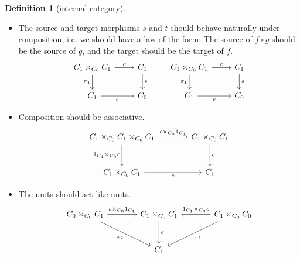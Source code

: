 \documentclass[a4paper,10pt]{scrreprt}
\theoremstyle{definition}
\newtheorem{definition}{Definition}[section]
\theoremstyle{plain}
\theoremstyle{remark}
\begin{document}
\begin{definition}[internal category]
\begin{itemize}
    \item The source and target morphisms $s$ and $t$ should behave naturally under composition, i.e. we should have a law of the form: The source of $f \circ g$ should be the source of $g$, and the target should be the target of $f$.
      \begin{equation*}
        \begin{tikzcd}
          C_{1} \times_{C_{0}} C_{1} 
          \arrow[r, "c"]
          \arrow[d, swap, "\pi_{1}"]
          & C_{1}
          \arrow[d, "s"]
          \\
          C_{1}
          \arrow[r, swap, "s"]
          & C_{0}
        \end{tikzcd}
        \qquad
        \begin{tikzcd}
          C_{1} \times_{C_{0}} C_{1} 
          \arrow[r, "c"]
          \arrow[d, swap, "\pi_{1}"]
          & C_{1}
          \arrow[d, "s"]
          \\
          C_{1}
          \arrow[r, swap, "s"]
          & C_{0}
        \end{tikzcd}
      \end{equation*}

    \item Composition should be associative.
      \begin{equation*}
        \begin{tikzcd}[column sep=large, row sep=large]
          C_{1} \times_{C_{0}} C_{1} \times_{C_{0}} C_{1}
          \arrow[r, "c \times_{C_{0}} 1_{C_{1}}"]
          \arrow[d, swap, "1_{C_{1}} \times_{C_{0}} c"]
          & C_{1} \times_{C_{0}} C_{1}
          \arrow[d, "c"]
          \\
          C_{1} \times_{C_{0}} C_{1}
          \arrow[r, swap, "c"]
          & C_{1}
        \end{tikzcd}
      \end{equation*}

    \item The units should act like units.
      \begin{equation*}
        \begin{tikzcd}[column sep=large, row sep=large]
          C_{0} \times_{C_{0}} C_{1}
          \arrow[r, "e \times_{C_{0}} 1_{C_{1}}"]
          \arrow[dr, swap, "\pi_{2}"]
          & C_{1} \times_{C_{0}} C_{1}
          \arrow[d, "c"]
          & C_{1} \times_{C_{0}} C_{0}
          \arrow[l, swap, "1_{C_{1}} \times_{C_{0}} e"]
          \arrow[dl, "\pi_{1}"]
          \\
          & C_{1}
        \end{tikzcd}
      \end{equation*}
  \end{itemize}


\end{definition}
\end{document}
